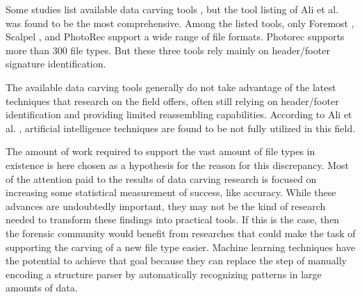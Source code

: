 
Some studies list available data carving tools
\cite{ali_review_2018}
\cite{qiu_new_2014}
\cite{nadeem_ashraf_forensic_2013}
\cite{roux_reconstructing_2008}, 
but the tool listing of Ali et al. \cite{ali_review_2018} was found to be the most comprehensive. Among the listed tools, only Foremost \cite{kendall_foremost_2019}, Scalpel \cite{richard_iii_scalpel:_2005}, and PhotoRec \cite{grenier_photorec_2019} support a wide range of file formats. Photorec supports more than 300 file types. But these three tools rely mainly on header/footer signature identification.

The available data carving tools generally do not take advantage of the latest techniques that research on the field offers, often still relying on header/footer identification and providing limited reassembling capabilities.
According to Ali et al. \cite{ali_review_2018}, artificial intelligence techniques are found to be not fully utilized in this field.



The amount of work required to support the vast amount of file types in existence is here chosen as a hypothesis for the reason for this discrepancy. Most of the attention paid to the results of data carving research is focused on increasing some statistical measurement of success, like accuracy. While these advances are undoubtedly important, they may not be the kind of research needed to transform these findings into practical tools. If this is the case, then the forensic community would benefit from researches that could make the task of supporting the carving of a new file type easier. Machine learning techniques have the potential to achieve that goal because they can replace the step of manually encoding a structure parser by automatically recognizing patterns in large amounts of data.

